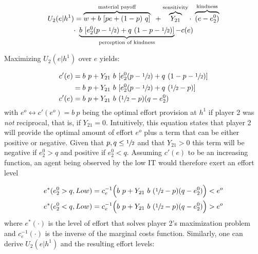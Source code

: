 \vspace{-10mm}
\begin{multline*}
	U_2(e|h^1) = \overbrace{w+b\ [pe+(1-p)\ q]}^{\text{material payoff}}\text{ } 
	+ \overbrace{Y_{21}}^{\text{sensitivity}}
	\cdot\ \overbrace{(e - e^0_2)}^{\text{kindness}}\\ 
	\cdot\ \underbrace{b\ [e^0_2(p-\sfrac{1}{2})+q\ (1-p-\sfrac{1}{2})]}_{\text{perception of kindness}}-c(e)
\end{multline*}

Maximizing $U_2(e|h^1)$ over $e$ yields:

\vspace{-10mm}
\begin{align*}
	c'(e) & = b\ p + Y_{21}\ b\ [e^0_2(p-\sfrac{1}{2})+q\ (1-p-\sfrac{1}{2})]\\
	& = b\ p + Y_{21}\ b\ [e^0_2(p-\sfrac{1}{2})+q\ (\sfrac{1}{2}-p)]\\
	c'(e) & = b\ p + Y_{21}\ b\ (\sfrac{1}{2}-p)(q-e^0_2)
\end{align*}
with $e^{o}\leftrightarrow c'(e^{o}) = b\ p$ being the optimal effort provision at $h^1$ if player 2 was \emph{not} reciprocal, that is, if $Y_{21}=0$. Intuitively, this equation states that player 2 will provide the optimal amount of effort $e^{o}$ plus a term that can be either positive or negative. Given that $p, q\leq\sfrac{1}{2}$ and that $Y_{21}>0$ this term will be negative if $e^0_2>q$ and positive if $e^0_2<q$. Assuming $c'(e)$ to be an increasing function, an agent being observed by the low IT would therefore exert an effort level

\vspace{-10mm}
\begin{align*}
	e^*(e^0_2>q, Low) & =c^{-1}_e\Big( b\ p + Y_{21}\ b\ (\sfrac{1}{2}-p)(q-e^0_2)\Big)<e^{o}\\
	e^*(e^0_2<q, Low) & =c^{-1}_e\Big( b\ p + Y_{21}\ b\ (\sfrac{1}{2}-p)(q-e^0_2)\Big)>e^{o}
\end{align*}
where $e^*(\cdot)$ is the level of effort that solves player 2's maximization problem and $c^{-1}_e(\cdot)$ is the inverse of the marginal costs function. Similarly, one can derive $U_2(e|h^1)$ and the resulting effort levels:

